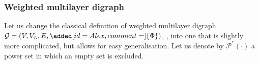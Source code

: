 \documentclass[a4paper,12pt]{article}
\theoremstyle{definition}
\newtheorem{definition}{Definition}%
\theoremstyle{remark}
\newcommand{\mat}[1]{\todo[inline,color=cMat]{\color{black}#1}}
\newcommand{\aadd}[2][]{\added[id=Alex,comment=#1]{#2}}
\newcommand{\mG}{\mathcal{G}}
\newcommand{\EG}{E_{\mathcal{G}}}
\begin{document}
\subsubsection{Weighted multilayer digraph}\label{sec:m_graph}
Let us change the classical definition of weighted multilayer  digraph $\mG = (V,V_L,E,\aadd{\Phi})$, \cite[Sec.~2.1]{KivArena2014}, into one that is slightly more complicated, but allows for easy generalisation. Let us denote by $\mathcal{P}^*(\cdot)$ a power set in which an empty set is excluded.
\end{document}
